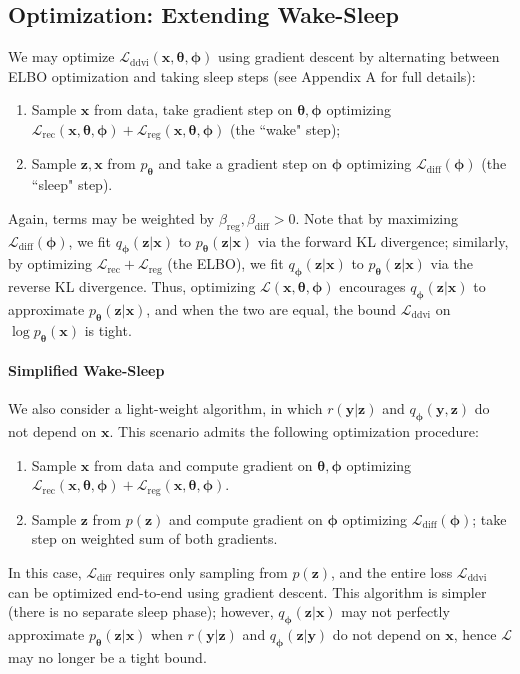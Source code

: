 \documentclass[letterpaper]{article} %
\newcommand{\bx}{\mathbf{x}}
\newcommand{\bz}{\mathbf{z}}
\newcommand{\by}{\mathbf{y}}
\newcommand\Lc{\mathcal{L}}
\let\oldtheta\theta
\renewcommand{\theta}{{\boldsymbol \oldtheta}}
\let\oldphi\phi
\renewcommand{\phi}{{\boldsymbol \oldphi}}
\begin{document}
\subsection{Optimization: Extending Wake-Sleep}\label{sec:latent-wake-sleep}

We may optimize $\Lc_\text{ddvi}(\bx, \theta, \phi)$ using gradient descent by alternating between ELBO optimization and taking sleep steps (see Appendix A for full details):
\begin{enumerate}
    \item Sample $\bx$ from data, take gradient step on $\theta, \phi$ optimizing $\Lc_\text{rec}(\bx, \theta, \phi) + \Lc_\text{reg}(\bx, \theta, \phi)$ (the ``wake" step);
    \item Sample $\bz, \bx$ from $p_\theta$ and take a gradient step on $\phi$ optimizing $\Lc_\text{diff}(\phi)$ (the ``sleep" step).
\end{enumerate}
Again, terms may be weighted by $\beta_\text{reg}, \beta_\text{diff} > 0$.
Note that by maximizing $\Lc_\text{diff}(\phi)$, we fit $q_\phi(\bz|\bx)$ to $p_\theta(\bz|\bx)$ via the forward KL divergence; similarly, by optimizing $\Lc_\text{rec} + \Lc_\text{reg}$ (the ELBO), we fit $q_\phi(\bz|\bx)$ to $p_\theta(\bz|\bx)$ via the reverse KL divergence. Thus, optimizing $\Lc(\bx, \theta, \phi)$ encourages $q_\phi(\bz|\bx)$ to approximate $p_\theta(\bz|\bx)$, and when the two are equal, the bound $\Lc_\text{ddvi}$ on $\log p_\theta(\bx)$ is tight.

\paragraph{Simplified Wake-Sleep}
We also consider a light-weight algorithm, in which $r(\by|\bz)$ and $q_\phi(\by, \bz)$ do not depend on $\bx$. This scenario admits the following optimization procedure:
\begin{enumerate}
    \item Sample $\bx$ from data and compute gradient on $\theta, \phi$ optimizing $\Lc_\text{rec}(\bx, \theta, \phi) + \Lc_\text{reg}(\bx, \theta, \phi)$.
    \item Sample $\bz$ from $p(\bz)$ and compute gradient on $\phi$ optimizing $ \Lc_\text{diff}(\phi)$; take step on weighted sum of both gradients.
\end{enumerate}
In this case, $\Lc_\text{diff}$ requires only sampling from $p(\bz)$, and the entire loss $\Lc_\text{ddvi}$ can be optimized end-to-end using gradient descent. This algorithm is simpler (there is no separate sleep phase); however, $q_\phi(\bz|\bx)$ may not perfectly approximate $p_\theta(\bz|\bx)$ when $r(\by|\bz)$ and $q_\phi(\bz|\by)$ do not depend on $\bx$, hence $\Lc$ may no longer be a tight bound.
\end{document}
